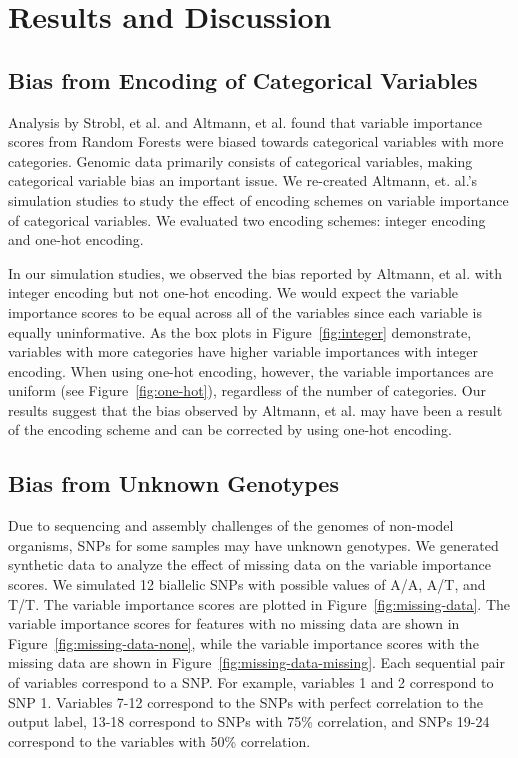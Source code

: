 \section{Results and Discussion}

\subsection{Bias from Encoding of Categorical Variables}
Analysis by Strobl, et al. \cite{Strobl2007} and Altmann, et al. \cite{Altmann2010} found that variable importance scores from Random Forests were biased towards categorical variables with more categories.  Genomic data primarily consists of categorical variables, making categorical variable bias an important issue.  We re-created Altmann, et. al.'s simulation studies to study the effect of encoding schemes on variable importance of categorical variables.  We evaluated two encoding schemes: integer encoding and one-hot encoding. 

In our simulation studies,  we observed the bias reported by Altmann, et al. \cite{Altmann2010} with integer encoding but not one-hot encoding. We would expect the variable importance scores to be equal across all of the variables since each variable is equally uninformative.  As the box plots in Figure~\ref{fig:integer} demonstrate, variables with more categories have higher variable importances with integer encoding.   When using one-hot encoding, however, the variable importances are uniform (see Figure~\ref{fig:one-hot}), regardless of the number of categories.  Our results suggest that the bias observed by Altmann, et al. may have been a result of the encoding scheme and can be corrected by using one-hot encoding.


\subsection{Bias from Unknown Genotypes}
Due to sequencing and assembly challenges of the genomes of non-model organisms, SNPs for some samples may have unknown genotypes.  We generated synthetic data to analyze the effect of missing data on the variable importance scores.  We simulated 12 biallelic SNPs with possible values of A/A, A/T, and T/T. 
The variable importance scores are plotted in Figure~\ref{fig:missing-data}.  The variable importance scores for features with no missing data are shown in Figure~\ref{fig:missing-data-none}, while the variable importance scores with the missing data are shown in Figure~\ref{fig:missing-data-missing}.  Each sequential pair of variables correspond to a SNP.  For example, variables 1 and 2 correspond to SNP 1. Variables 7-12 correspond to the SNPs with perfect correlation to the output label, 13-18 correspond to SNPs with 75\% correlation, and SNPs 19-24 correspond to the variables with 50\% correlation.


